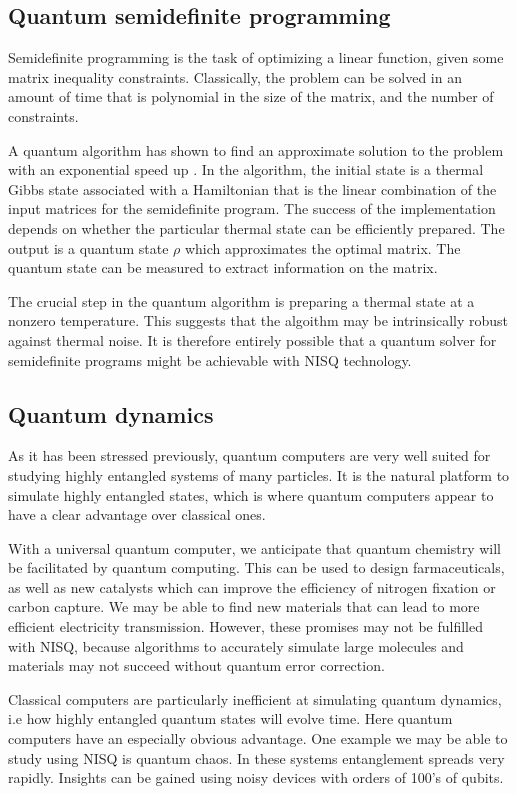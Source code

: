 \subsection{Quantum semidefinite programming}

Semidefinite programming is the task of optimizing a linear function, given some matrix inequality constraints. Classically, the problem can be solved in an amount of time that 
is polynomial in the size of the matrix, and the number of constraints.

A quantum algorithm has shown to find an approximate solution to the problem with an exponential speed up \cite{}. In the algorithm, the initial state is a thermal Gibbs state associated with a Hamiltonian that is the linear combination of the input matrices for the semidefinite program. The success of the implementation depends on whether the particular thermal state can be efficiently prepared. 
The output is a quantum state $\rho$ which approximates the optimal matrix. The quantum state can be measured to extract information on the matrix. 


The crucial step in the quantum algorithm is preparing a thermal state at a nonzero temperature. This suggests that the algoithm may be intrinsically robust against thermal noise. It is therefore entirely possible that a quantum solver for semidefinite programs might be achievable with NISQ technology.


\subsection{Quantum dynamics}
As it has been stressed previously, quantum computers are very well suited for studying highly entangled systems of many particles. It is the natural platform to simulate highly entangled states, which is where quantum computers appear to have a clear advantage over classical ones.
 
With a universal quantum computer, we anticipate that quantum chemistry will be facilitated by quantum computing. This can be used to design farmaceuticals, as well as new catalysts which can improve the efficiency of nitrogen fixation or carbon capture. We may be able to find new materials that can lead to more efficient electricity transmission. However, these promises may not be fulfilled with NISQ, because algorithms to accurately simulate large molecules and materials may not succeed without quantum error correction.

Classical computers are particularly inefficient at simulating quantum dynamics, i.e how highly entangled quantum states will evolve time. Here quantum computers have an especially obvious advantage. One example we may be able to study using NISQ is quantum chaos. In these systems entanglement spreads very rapidly. Insights can be gained using noisy devices with orders of 100's of qubits.

